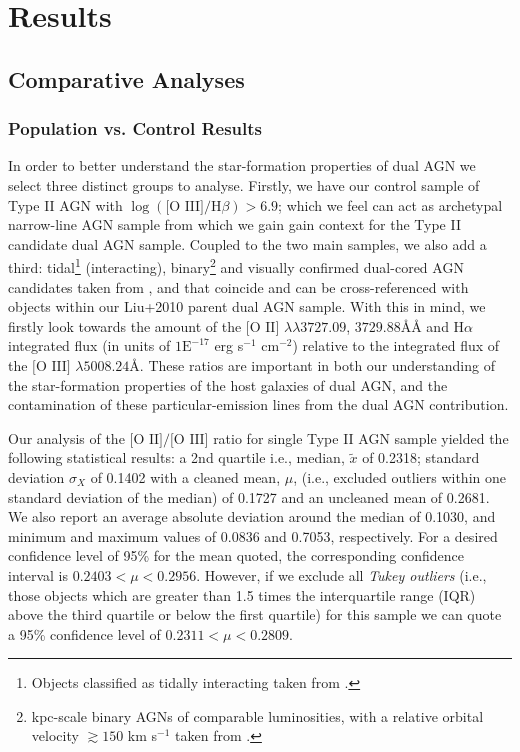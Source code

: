 \section{Results}
\subsection{Comparative Analyses}
\subsubsection{Population vs. Control Results}

In order to better understand the star-formation properties of dual AGN we select three distinct groups to analyse. Firstly, we have our control sample of Type II AGN with $\log{(\text{[O III]}/\text{H}\beta)}>{6.9}$; which we feel can act as archetypal narrow-line AGN sample from which we gain gain context for the Type II candidate dual AGN sample. Coupled to the two main samples, we also add a third: tidal\footnote{\tiny{Objects classified as tidally interacting taken from \cite{Liu_2011}.}} (interacting), binary\footnote{\tiny{kpc-scale binary AGNs of comparable luminosities, with a relative orbital velocity $\gtrsim{150}$ km s$^{-1}$ taken from \cite{Shen_Liu_Greene_Strauss_2011}.}} and visually confirmed dual-cored AGN candidates taken from \cite{Ge_Hu_Wang_Bai_Zhang_2012}, and that coincide and can be cross-referenced with objects within our Liu+2010 parent dual AGN sample. With this in mind, we firstly look towards the amount of the $\text{[O II]}$ $\lambda\lambda$$3727.09$, $3729.88$\AA\AA{} and $\text{H}\alpha$ integrated flux (in units of $1\text{E}^{-17}$ erg s$^{-1}$ cm$^{-2}$) relative to the integrated flux of the $\text{[O III]}$ $\lambda$$5008.24$\AA. These ratios are important in both our understanding of the star-formation properties of the host galaxies of dual AGN, and the contamination of these particular-emission lines from the dual AGN contribution.

Our analysis of the $\text{[O II]/[O III]}$ ratio for single Type II AGN sample yielded the following statistical results: a 2nd quartile i.e., median, $\tilde{x}$ of 0.2318; standard deviation $\sigma_{X}$ of 0.1402 with a cleaned mean, $\mu$, (i.e., excluded outliers within one standard deviation of the median) of 0.1727 and an uncleaned mean of 0.2681. We also report an average absolute deviation around the median of 0.1030, and minimum and maximum values of 0.0836 and 0.7053, respectively. For a desired confidence level of 95\% for the mean quoted, the corresponding confidence interval is ${0.2403}<{\mu}<{0.2956}$. However, if we exclude all \textit{Tukey outliers} (i.e., those objects which are greater than 1.5 times the interquartile range (IQR) above the third quartile or below the first quartile) for this sample we can quote a 95\% confidence level of ${0.2311}<{\mu}<{0.2809}$.

